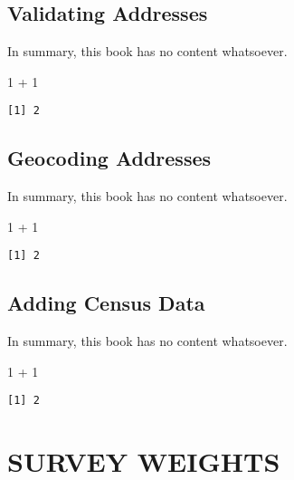 \documentclass[
  letterpaper,
]{scrbook}
\newenvironment{Shaded}{\begin{snugshade}}{\end{snugshade}}
\newcommand{\DecValTok}[1]{\textcolor[rgb]{0.68,0.00,0.00}{#1}}
\newcommand{\SpecialCharTok}[1]{\textcolor[rgb]{0.37,0.37,0.37}{#1}}
\begin{document}
\chapter{Validating Addresses}\label{validating-addresses}

In summary, this book has no content whatsoever.

\begin{Shaded}
\begin{Highlighting}[]
\DecValTok{1} \SpecialCharTok{+} \DecValTok{1}
\end{Highlighting}
\end{Shaded}

\begin{verbatim}
[1] 2
\end{verbatim}

\chapter{Geocoding Addresses}\label{geocoding-addresses}

In summary, this book has no content whatsoever.

\begin{Shaded}
\begin{Highlighting}[]
\DecValTok{1} \SpecialCharTok{+} \DecValTok{1}
\end{Highlighting}
\end{Shaded}

\begin{verbatim}
[1] 2
\end{verbatim}

\chapter{Adding Census Data}\label{adding-census-data}

In summary, this book has no content whatsoever.

\begin{Shaded}
\begin{Highlighting}[]
\DecValTok{1} \SpecialCharTok{+} \DecValTok{1}
\end{Highlighting}
\end{Shaded}

\begin{verbatim}
[1] 2
\end{verbatim}

\part{SURVEY WEIGHTS}
\end{document}
